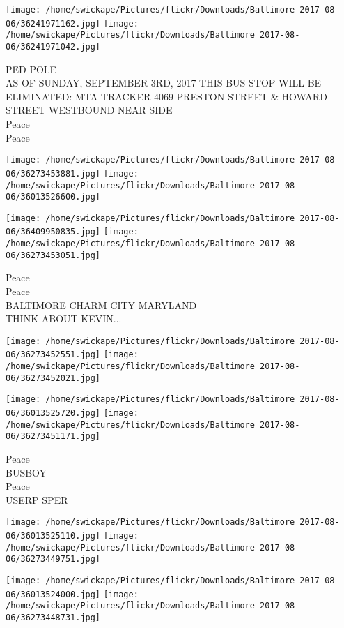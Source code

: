 \documentclass[10pt,letterpaper]{article}
\begin{document}
\texttt{[image: /home/swickape/Pictures/flickr/Downloads/Baltimore 2017-08-06/36241971162.jpg]}
\texttt{[image: /home/swickape/Pictures/flickr/Downloads/Baltimore 2017-08-06/36241971042.jpg]}

PED POLE\\
AS OF SUNDAY, SEPTEMBER 3RD, 2017 THIS BUS STOP WILL BE ELIMINATED: MTA TRACKER 4069 PRESTON STREET \& HOWARD STREET WESTBOUND NEAR SIDE\\
Peace\\
Peace
\pagebreak

\texttt{[image: /home/swickape/Pictures/flickr/Downloads/Baltimore 2017-08-06/36273453881.jpg]}
\texttt{[image: /home/swickape/Pictures/flickr/Downloads/Baltimore 2017-08-06/36013526600.jpg]}

\texttt{[image: /home/swickape/Pictures/flickr/Downloads/Baltimore 2017-08-06/36409950835.jpg]}
\texttt{[image: /home/swickape/Pictures/flickr/Downloads/Baltimore 2017-08-06/36273453051.jpg]}

Peace\\
Peace\\
BALTIMORE CHARM CITY MARYLAND\\
THINK ABOUT KEVIN...
\pagebreak

\texttt{[image: /home/swickape/Pictures/flickr/Downloads/Baltimore 2017-08-06/36273452551.jpg]}
\texttt{[image: /home/swickape/Pictures/flickr/Downloads/Baltimore 2017-08-06/36273452021.jpg]}

\texttt{[image: /home/swickape/Pictures/flickr/Downloads/Baltimore 2017-08-06/36013525720.jpg]}
\texttt{[image: /home/swickape/Pictures/flickr/Downloads/Baltimore 2017-08-06/36273451171.jpg]}

Peace\\
BUSBOY\\
Peace\\
USERP SPER
\pagebreak

\texttt{[image: /home/swickape/Pictures/flickr/Downloads/Baltimore 2017-08-06/36013525110.jpg]}
\texttt{[image: /home/swickape/Pictures/flickr/Downloads/Baltimore 2017-08-06/36273449751.jpg]}

\texttt{[image: /home/swickape/Pictures/flickr/Downloads/Baltimore 2017-08-06/36013524000.jpg]}
\texttt{[image: /home/swickape/Pictures/flickr/Downloads/Baltimore 2017-08-06/36273448731.jpg]}
\end{document}
